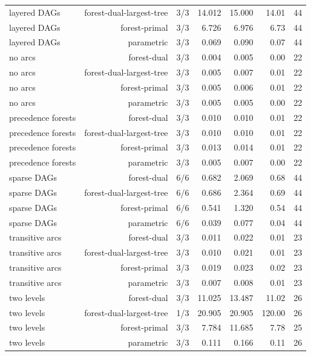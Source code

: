 {\begin{longtable}{lrrrrrr}
layered DAGs & forest-dual-largest-tree & 3/3 & 14.012 & 15.000 & 14.01 & 44 \\
layered DAGs & forest-primal & 3/3 & 6.726 & 6.976 & 6.73 & 44 \\
layered DAGs & parametric & 3/3 & 0.069 & 0.090 & 0.07 & 44 \\
no arcs & forest-dual & 3/3 & 0.004 & 0.005 & 0.00 & 22 \\
no arcs & forest-dual-largest-tree & 3/3 & 0.005 & 0.007 & 0.01 & 22 \\
no arcs & forest-primal & 3/3 & 0.005 & 0.006 & 0.01 & 22 \\
no arcs & parametric & 3/3 & 0.005 & 0.005 & 0.00 & 22 \\
precedence forests & forest-dual & 3/3 & 0.010 & 0.010 & 0.01 & 22 \\
precedence forests & forest-dual-largest-tree & 3/3 & 0.010 & 0.010 & 0.01 & 22 \\
precedence forests & forest-primal & 3/3 & 0.013 & 0.014 & 0.01 & 22 \\
precedence forests & parametric & 3/3 & 0.005 & 0.007 & 0.00 & 22 \\
sparse DAGs & forest-dual & 6/6 & 0.682 & 2.069 & 0.68 & 44 \\
sparse DAGs & forest-dual-largest-tree & 6/6 & 0.686 & 2.364 & 0.69 & 44 \\
sparse DAGs & forest-primal & 6/6 & 0.541 & 1.320 & 0.54 & 44 \\
sparse DAGs & parametric & 6/6 & 0.039 & 0.077 & 0.04 & 44 \\
transitive arcs & forest-dual & 3/3 & 0.011 & 0.022 & 0.01 & 23 \\
transitive arcs & forest-dual-largest-tree & 3/3 & 0.010 & 0.021 & 0.01 & 23 \\
transitive arcs & forest-primal & 3/3 & 0.019 & 0.023 & 0.02 & 23 \\
transitive arcs & parametric & 3/3 & 0.007 & 0.008 & 0.01 & 23 \\
two levels & forest-dual & 3/3 & 11.025 & 13.487 & 11.02 & 26 \\
two levels & forest-dual-largest-tree & 1/3 & 20.905 & 20.905 & 120.00 & 26 \\
two levels & forest-primal & 3/3 & 7.784 & 11.685 & 7.78 & 25 \\
two levels & parametric & 3/3 & 0.111 & 0.166 & 0.11 & 26 \\
\end{longtable}
}
